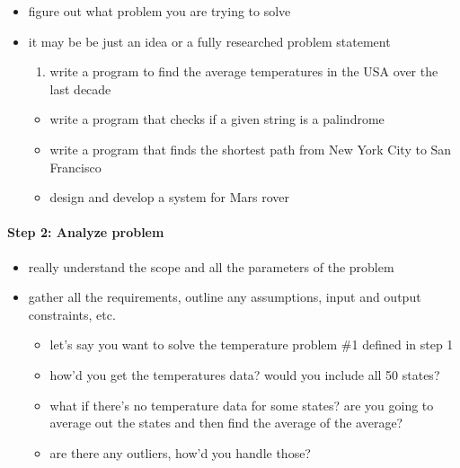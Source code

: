 \documentclass[11pt]{article}
\providecommand{\tightlist}{%
      \setlength{\itemsep}{0pt}\setlength{\parskip}{0pt}}
\begin{document}
\begin{itemize}
\tightlist
\item
  figure out what problem you are trying to solve
\item
  it may be be just an idea or a fully researched problem statement

  \begin{enumerate}
  \def\labelenumi{\arabic{enumi}.}
  \tightlist
  \item
    write a program to find the average temperatures in the USA over the
    last decade
  \end{enumerate}

  \begin{itemize}
  \tightlist
  \item
    write a program that checks if a given string is a palindrome
  \item
    write a program that finds the shortest path from New York City to
    San Francisco
  \item
    design and develop a system for Mars rover
  \end{itemize}
\end{itemize}

\hypertarget{step-2-analyze-problem}{%
\paragraph{Step 2: Analyze problem}\label{step-2-analyze-problem}}

\begin{itemize}
\tightlist
\item
  really understand the scope and all the parameters of the problem
\item
  gather all the requirements, outline any assumptions, input and output
  constraints, etc.

  \begin{itemize}
  \tightlist
  \item
    let's say you want to solve the temperature problem \#1 defined in
    step 1
  \item
    how'd you get the temperatures data? would you include all 50
    states?
  \item
    what if there's no temperature data for some states? are you going
    to average out the states and then find the average of the average?
  \item
    are there any outliers, how'd you handle those?
  \end{itemize}
\end{itemize}
\end{document}
